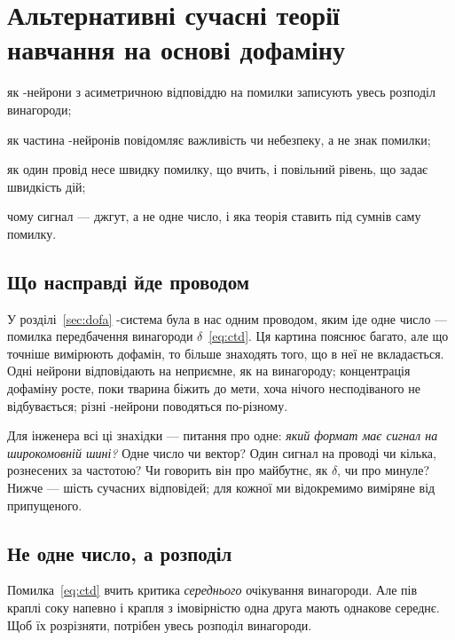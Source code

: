 \chapter{Альтернативні сучасні теорії навчання на основі дофаміну}
\label{sec:dofaalt}
\begin{chaptergoals}
\item як -нейрони з асиметричною відповіддю на помилки записують увесь розподіл винагороди;
\item як частина -нейронів повідомляє важливість чи небезпеку, а не знак помилки;
\item як один провід несе швидку помилку, що вчить, і повільний рівень, що задає швидкість дій;
\item чому сигнал  --- джгут, а не одне число, і яка теорія ставить під сумнів саму помилку.
\end{chaptergoals}

\section{Що насправді йде проводом}

У розділі~\ref{sec:dofa} -система була в нас одним проводом, яким іде одне число --- помилка передбачення винагороди $\delta$~\eqref{eq:ctd}. Ця картина пояснює багато, але що точніше вимірюють дофамін, то більше знаходять того, що в неї не вкладається. Одні нейрони відповідають на неприємне, як на винагороду; концентрація дофаміну росте, поки тварина біжить до мети, хоча нічого несподіваного не відбувається; різні -нейрони поводяться по-різному.

Для інженера всі ці знахідки --- питання про одне: \emph{який формат має сигнал на широкомовній шині?} Одне число чи вектор? Один сигнал на проводі чи кілька, рознесених за частотою? Чи говорить він про майбутнє, як $\delta$, чи про минуле? Нижче --- шість сучасних відповідей; для кожної ми відокремимо виміряне від припущеного.

\section{Не одне число, а розподіл}

Помилка~\eqref{eq:ctd} вчить критика \emph{середнього} очікування винагороди. Але пів краплі соку напевно і крапля з імовірністю одна друга мають однакове середнє. Щоб їх розрізняти, потрібен увесь розподіл винагороди.


